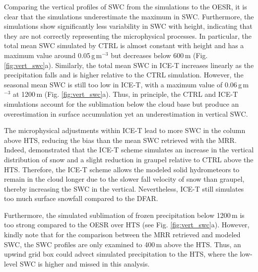 \documentclass{ametsocV5}
\begin{document}
		Comparing the vertical profiles of SWC from the simulations to the OESR, it is clear that the simulations underestimate the maximum in SWC. Furthermore, the simulations show significantly less variability in SWC with height, indicating that they are not correctly representing the microphysical processes. In particular, the total mean SWC simulated by CTRL is almost constant with height and has a maximum value around 0.05\,g\,m$^{-3}$ but decreases below 600\,m (Fig. \ref{fig:vert_swc}a). Similarly, the total mean SWC in ICE-T increases linearly as the precipitation falls and is higher relative to the CTRL simulation. However, the seasonal mean SWC is still too low in ICE-T, with a maximum value of 0.06\,g\,m$^{-3}$ at 1200\,m (Fig. \ref{fig:vert_swc}a). Thus, in principle, the CTRL and ICE-T simulations account for the sublimation below the cloud base but produce an overestimation in surface accumulation yet an underestimation in vertical SWC. 

		The microphysical adjustments within ICE-T lead to more SWC in the column above HTS, reducing the bias than the mean SWC retrieved with the MRR. Indeed, \citet{engdahl_effects_2020} demonstrated that the ICE-T scheme simulates an increase in the vertical distribution of snow and a slight reduction in graupel relative to CTRL above the HTS. Therefore, the ICE-T scheme allows the modeled solid hydrometeors to remain in the cloud longer due to the slower fall velocity of snow than graupel, thereby increasing the SWC in the vertical. Nevertheless, ICE-T still simulates too much surface snowfall compared to the DFAR. 
		
		Furthermore, the simulated sublimation of frozen precipitation below 1200\,m is too strong compared to the OESR over HTS (see Fig. \ref{fig:vert_swc}a). However, kindly note that for the comparison between the MRR retrieved and modeled SWC, the SWC profiles are only examined to 400\,m above the HTS. Thus, an upwind grid box could advect simulated precipitation to the HTS, where the low-level SWC is higher and missed in this analysis.
\end{document}
